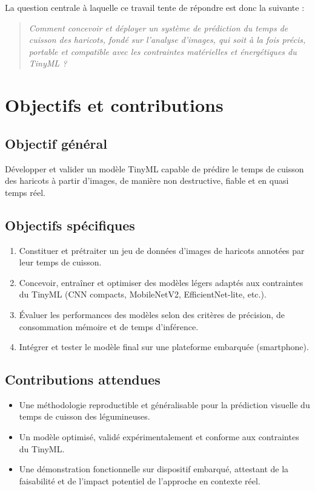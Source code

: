 La question centrale à laquelle ce travail tente de répondre est donc la suivante :
\begin{quote}
    \textit{Comment concevoir et déployer un système de prédiction du temps de cuisson des haricots, fondé sur l’analyse d’images, qui soit à la fois précis, portable et compatible avec les contraintes matérielles et énergétiques du TinyML ?}
\end{quote}

\section{Objectifs et contributions}

\subsection{Objectif général}
Développer et valider un modèle TinyML capable de prédire le temps de cuisson des haricots à partir d’images, de manière non destructive, fiable et en quasi temps réel.

\subsection{Objectifs spécifiques}
\begin{enumerate}
    \item Constituer et prétraiter un jeu de données d’images de haricots annotées par leur temps de cuisson.
    \item Concevoir, entraîner et optimiser des modèles légers adaptés aux contraintes du TinyML (CNN compacts, MobileNetV2, EfficientNet-lite, etc.).
    \item Évaluer les performances des modèles selon des critères de précision, de consommation mémoire et de temps d’inférence.
    \item Intégrer et tester le modèle final sur une plateforme embarquée (smartphone).
\end{enumerate}

\subsection{Contributions attendues}
\begin{itemize}
    \item Une méthodologie reproductible et généralisable pour la prédiction visuelle du temps de cuisson des légumineuses.
    \item Un modèle optimisé, validé expérimentalement et conforme aux contraintes du TinyML.
    \item Une démonstration fonctionnelle sur dispositif embarqué, attestant de la faisabilité et de l’impact potentiel de l’approche en contexte réel.
\end{itemize}

